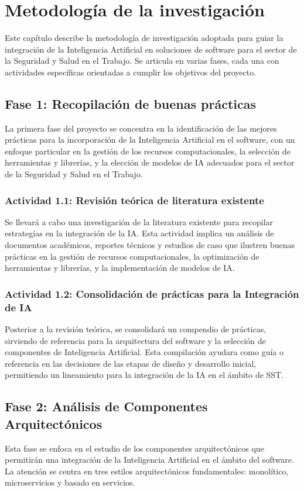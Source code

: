 \section{Metodología de la investigación}
Este capítulo describe la metodología de investigación adoptada para guiar la integración de la Inteligencia Artificial en soluciones de software para el sector de la Seguridad y Salud en el Trabajo. Se articula en varias fases, cada una con actividades específicas orientadas a cumplir los objetivos del proyecto.

\subsection{Fase 1: Recopilación de buenas prácticas}
La primera fase del proyecto se concentra en la identificación de las mejores prácticas para la incorporación de la Inteligencia Artificial en el software, con un enfoque particular en la gestión de los recursos computacionales, la selección de herramientas y librerías, y la elección de modelos de IA adecuados para el sector de la Seguridad y Salud en el Trabajo.

\subsubsection{Actividad 1.1: Revisión teórica de literatura existente}
Se llevará a cabo una investigación de la literatura existente para recopilar estrategias en la integración de la IA. Esta actividad implica un análisis de documentos académicos, reportes técnicos y estudios de caso que ilustren buenas prácticas en la gestión de recursos computacionales, la optimización de herramientas y librerías, y la implementación de modelos de IA.

\subsubsection{Actividad 1.2: Consolidación de prácticas para la Integración de IA}
Posterior a la revisión teórica, se consolidará un compendio de prácticas, sirviendo de referencia para la arquitectura del software y la selección de componentes de Inteligencia Artificial. Esta compilación ayudara como guía o referencia en las decisiones de las etapas de diseño y desarrollo inicial, permitiendo un lineamiento para la integración de la IA en el ámbito de SST.





\subsection{Fase 2: Análisis de Componentes Arquitectónicos}
Esta fase se enfoca en el estudio de los componentes arquitectónicos que permitirán una integración de la Inteligencia Artificial en el ámbito del software. La atención se centra en tres estilos arquitectónicos fundamentales: monolítico, microservicios y basado en servicios.

